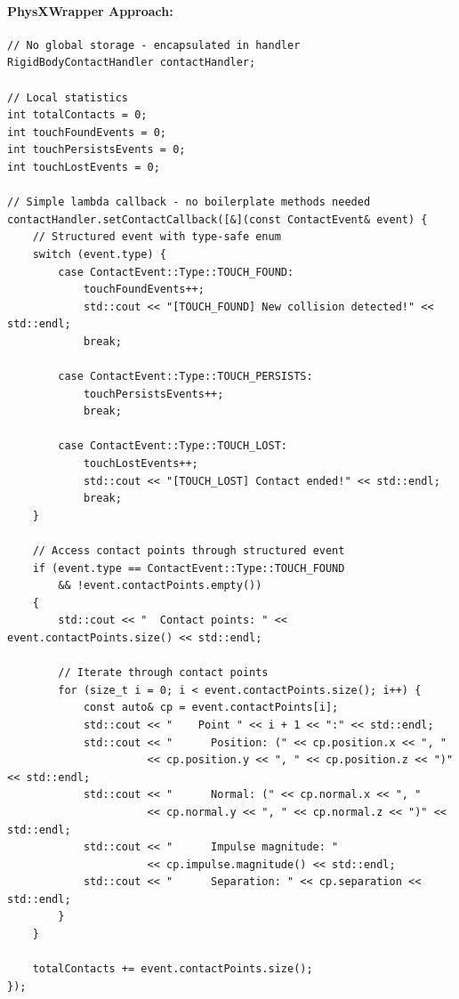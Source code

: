 \paragraph{PhysXWrapper Approach:}

\begin{lstlisting}[style=cpp, caption=Wrapper Lambda Callback Approach]
// No global storage - encapsulated in handler
RigidBodyContactHandler contactHandler;

// Local statistics
int totalContacts = 0;
int touchFoundEvents = 0;
int touchPersistsEvents = 0;
int touchLostEvents = 0;

// Simple lambda callback - no boilerplate methods needed
contactHandler.setContactCallback([&](const ContactEvent& event) {
    // Structured event with type-safe enum
    switch (event.type) {
        case ContactEvent::Type::TOUCH_FOUND:
            touchFoundEvents++;
            std::cout << "[TOUCH_FOUND] New collision detected!" << std::endl;
            break;

        case ContactEvent::Type::TOUCH_PERSISTS:
            touchPersistsEvents++;
            break;

        case ContactEvent::Type::TOUCH_LOST:
            touchLostEvents++;
            std::cout << "[TOUCH_LOST] Contact ended!" << std::endl;
            break;
    }

    // Access contact points through structured event
    if (event.type == ContactEvent::Type::TOUCH_FOUND
        && !event.contactPoints.empty())
    {
        std::cout << "  Contact points: " << event.contactPoints.size() << std::endl;

        // Iterate through contact points
        for (size_t i = 0; i < event.contactPoints.size(); i++) {
            const auto& cp = event.contactPoints[i];
            std::cout << "    Point " << i + 1 << ":" << std::endl;
            std::cout << "      Position: (" << cp.position.x << ", "
                      << cp.position.y << ", " << cp.position.z << ")" << std::endl;
            std::cout << "      Normal: (" << cp.normal.x << ", "
                      << cp.normal.y << ", " << cp.normal.z << ")" << std::endl;
            std::cout << "      Impulse magnitude: "
                      << cp.impulse.magnitude() << std::endl;
            std::cout << "      Separation: " << cp.separation << std::endl;
        }
    }

    totalContacts += event.contactPoints.size();
});
\end{lstlisting}

